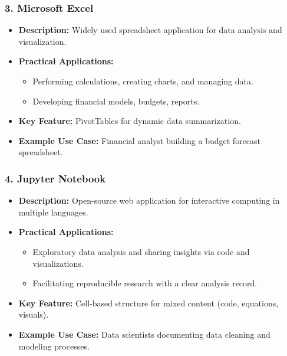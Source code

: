 \documentclass[aspectratio=169]{beamer}
\begin{document}
\begin{frame}[fragile]
    \frametitle{3. Microsoft Excel}
    \begin{itemize}
        \item \textbf{Description:} Widely used spreadsheet application for data analysis and visualization.
        \item \textbf{Practical Applications:}
        \begin{itemize}
            \item Performing calculations, creating charts, and managing data.
            \item Developing financial models, budgets, reports.
        \end{itemize}
        \item \textbf{Key Feature:} PivotTables for dynamic data summarization.
        \item \textbf{Example Use Case:} Financial analyst building a budget forecast spreadsheet.
    \end{itemize}
\end{frame}

\begin{frame}[fragile]
    \frametitle{4. Jupyter Notebook}
    \begin{itemize}
        \item \textbf{Description:} Open-source web application for interactive computing in multiple languages.
        \item \textbf{Practical Applications:}
        \begin{itemize}
            \item Exploratory data analysis and sharing insights via code and visualizations.
            \item Facilitating reproducible research with a clear analysis record.
        \end{itemize}
        \item \textbf{Key Feature:} Cell-based structure for mixed content (code, equations, visuals).
        \item \textbf{Example Use Case:} Data scientists documenting data cleaning and modeling processes.
    \end{itemize}
\end{frame}
\end{document}
